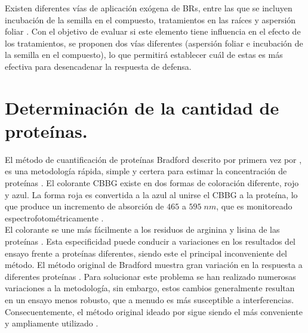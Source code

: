 Existen diferentes v\'ias de aplicaci\'on ex\'ogena de BRs, entre las que se incluyen incubaci\'on de la semilla en el compuesto, tratamientos en las ra\'ices y aspersión foliar \citep{yusuf2019interplay}. Con el objetivo de evaluar si este elemento tiene influencia en el efecto de los tratamientos, se proponen dos v\'ias diferentes (aspersi\'on foliar e incubaci\'on de la semilla en el compuesto), lo que permitir\'a establecer cu\'al de estas es m\'as efectiva para desencadenar la respuesta de defensa. \\ 



\section{Determinaci\'on de la cantidad de prote\'inas.}

El m\'etodo de cuantificaci\'on de prote\'inas Bradford descrito por primera vez por \cite{bradford1976rapid}, es una metodolog\'ia r\'apida, simple y certera para estimar la concentraci\'on de prote\'inas \citep{kruger2009bradford}. El colorante CBBG existe en dos formas de coloraci\'on diferente, rojo y azul. La forma roja es convertida a la azul al unirse el CBBG a la prote\'ina, lo que produce un incremento de absorci\'on de $465$ a $595\;nm$, que es monitoreado espectrofotom\'etricamente \citep{bradford1976rapid}. \\

El colorante se une más fácilmente a los residuos de arginina y lisina de las proteínas \citep{compton1985mechanism, congdon1993binding}. Esta especificidad puede conducir a variaciones en los resultados del ensayo frente a proteínas diferentes, siendo este el principal inconveniente del m\'etodo. El m\'etodo original de Bradford muestra gran variaci\'on en la respuesta a diferentes prote\'inas \citep{read1981minimization, friedenauer1989sensitivity, stoscheck1990increased}. Para solucionar este problema se han realizado numerosas variaciones a la metodolog\'ia, sin embargo, estos cambios generalmente resultan en un ensayo menos robusto, que a menudo es m\'as susceptible a interferencias. Consecuentemente, el método original ideado por \cite{bradford1976rapid} sigue siendo el m\'as conveniente y ampliamente  utilizado \citep{kruger2009bradford}. \\

